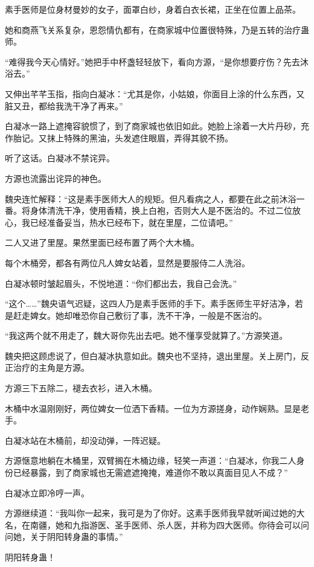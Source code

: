 \begin{this_body}
素手医师是位身材曼妙的女子，面罩白纱，身着白衣长裙，正坐在位置上品茶。

她和商燕飞关系复杂，恩怨情仇都有，在商家城中位置很特殊，乃是五转的治疗蛊师。

“难得我今天心情好。”她把手中杯盏轻轻放下，看向方源，“是你想要疗伤？先去沐浴去。”

又伸出芊芊玉指，指向白凝冰：“尤其是你，小姑娘，你面目上涂的什么东西，又脏又丑，都给我洗干净了再来。”

白凝冰一路上遮掩容貌惯了，到了商家城也依旧如此。她脸上涂着一大片丹砂，充作胎记。又抹上特殊的黑油，头发遮住眼眉，弄得其貌不扬。

听了这话。白凝冰不禁诧异。

方源也流露出诧异的神色。

魏央连忙解释：“这是素手医师大人的规矩。但凡看病之人，都要在此之前沐浴一番。将身体清洗干净，使用香精，换上白袍，否则大人是不医治的。不过二位放心，我已经准备妥当，热水已经布下，就在里屋，二位请吧。”

二人又进了里屋。果然里面已经布置了两个大木桶。

每个木桶旁，都各有两位凡人婢女站着，显然是要服侍二人洗浴。

白凝冰顿时皱起眉头，不悦地道：“你们都出去，我自己会洗。”

“这个……”魏央语气迟疑，这四人乃是素手医师的手下。素手医师生平好洁净，若是赶走婢女。她却唯恐你自己敷衍了事，洗不干净，一般是不医治的。

“我这两个就不用走了，魏大哥你先出去吧。她不懂享受就算了。”方源笑道。

魏央把这顾虑说了，但白凝冰执意如此。魏央也不坚持，退出里屋。关上房门，反正治疗的主角是方源。

方源三下五除二，褪去衣衫，进入木桶。

木桶中水温刚刚好，两位婢女一位洒下香精。一位为方源搓身，动作娴熟。显是老手。

白凝冰站在木桶前，却没动弹，一阵迟疑。

方源惬意地躺在木桶里，双臂搁在木桶边缘，轻笑一声道：“白凝冰，你我二人身份已经暴露，到了商家城也无需遮遮掩掩，难道你不敢以真面目见人不成？”

白凝冰立即冷哼一声。

方源继续道：“我叫你一起来，我可是为了你好。这素手医师我早就听闻过她的大名，在南疆，她和九指游医、圣手医师、杀人医，并称为四大医师。你待会可以问问她，关于阴阳转身蛊的事情。”

阴阳转身蛊！


\end{this_body}
